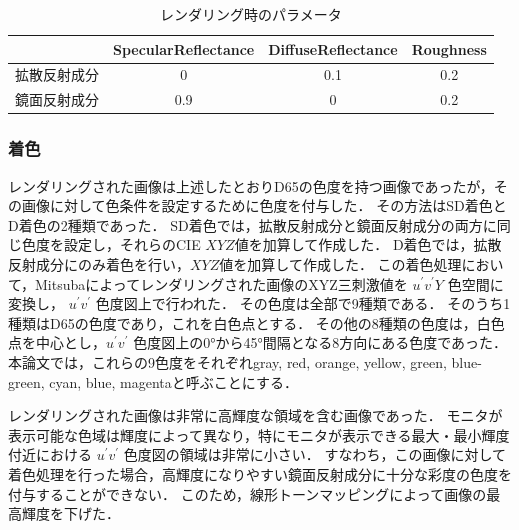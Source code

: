                 \begin{table}[h]
                    \centering
                    \caption{レンダリング時のパラメータ}
                    \begin{tabular}{|l||c|c|c|} \hline
                                            & SpecularReflectance & DiffuseReflectance & Roughness \\ \hline \hline
                        拡散反射成分           & 0                   & 0.1                & 0.2 \\ \hline
                        鏡面反射成分           & 0.9                 & 0                  & 0.2 \\ \hline
                    \end{tabular}
                    \label{render_param}
                \end{table}
            
            \subsubsection{着色}

                レンダリングされた画像は上述したとおりD65の色度を持つ画像であったが，その画像に対して色条件を設定するために色度を付与した．
                その方法はSD着色とD着色の2種類であった．
                SD着色では，拡散反射成分と鏡面反射成分の両方に同じ色度を設定し，それらのCIE $XYZ$値を加算して作成した．
                D着色では，拡散反射成分にのみ着色を行い，$XYZ$値を加算して作成した．
                この着色処理において，Mitsubaによってレンダリングされた画像のXYZ三刺激値を $u^{\prime}v^{\prime}Y$ 色空間に変換し， $u^{\prime}v^{\prime}$ 色度図上で行われた．
                その色度は全部で9種類である．
                そのうち1種類はD65の色度であり，これを白色点とする．
                その他の8種類の色度は，白色点を中心とし，$u^{\prime}v^{\prime}$ 色度図上の0°から45°間隔となる8方向にある色度であった．
                本論文では，これらの9色度をそれぞれgray, red, orange, yellow, green, blue-green, cyan, blue, magentaと呼ぶことにする．

                レンダリングされた画像は非常に高輝度な領域を含む画像であった．
                モニタが表示可能な色域は輝度によって異なり，特にモニタが表示できる最大・最小輝度付近における $u^{\prime}v^{\prime}$ 色度図の領域は非常に小さい．
                すなわち，この画像に対して着色処理を行った場合，高輝度になりやすい鏡面反射成分に十分な彩度の色度を付与することができない．
                このため，線形トーンマッピングによって画像の最高輝度を下げた．

